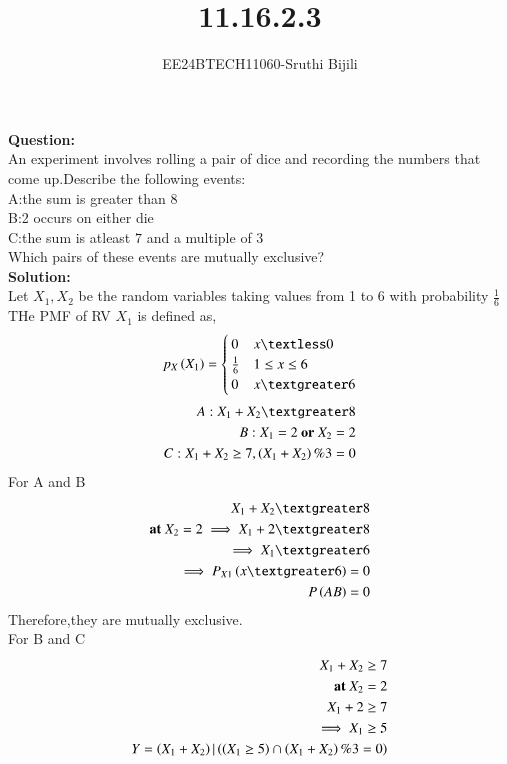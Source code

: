 \documentclass[journal]{IEEEtran}
\begin{document}

\vspace{3cm}

\title{11.16.2.3}
\author{EE24BTECH11060-Sruthi Bijili}
{\let\newpage\relax\maketitle}
\textbf{Question:}\\
An experiment involves rolling a pair of dice and recording the numbers that come up.Describe the following events:\\
A:the sum is greater than $8$\\
B:2 occurs on either die\\
C:the sum is atleast $7$ and a multiple of $3$\\
Which pairs of these events are mutually exclusive?\\
\textbf{Solution:}\\
Let $X_1,X_2$ be the random variables taking values from 1 to 6 with probability $\frac{1}{6}$\\
THe PMF of RV $X_1$ is defined as,
   \begin{align}
  p_X\brak{X_1} = \begin{cases}
    0 & x \textless 0\\
    \frac{1}{6} &  1\leq x \leq 6\\
    0 & x \textgreater 6
  \end{cases}
\end{align}
\begin{align}
    A:X_1+X_2 \textgreater 8\\
    B:X_1=2 \textbf{ or }X_2=2\\
    C:X_1+X_2 \geq 7 ,\brak{X_1+X_2 }\% 3=0 
\end{align}
For A and B
\begin{align}
    X_1+X_2 \textgreater 8\\
    \textbf{at } X_2=2\implies X_1+2 \textgreater 8\\
    \implies X_1 \textgreater 6\\
    \implies P_{X1}\brak{x \textgreater 6}=0\\
    P\brak{AB}=0 
\end{align}
Therefore,they are mutually exclusive.\\
For B and C
\begin{align}
    X_1+X_2 \geq 7\\
    \textbf{ at }  X_2=2\\
    X_1+2\geq 7\\ 
    \implies X_1\geq 5 \\
    Y=\left(X_1+X_2\right)|\left(\left(X_1 \geq 5\right)\cap \left(X_1+X_2 \right)\% 3=0\right) 
\end{align}
\end{document}
